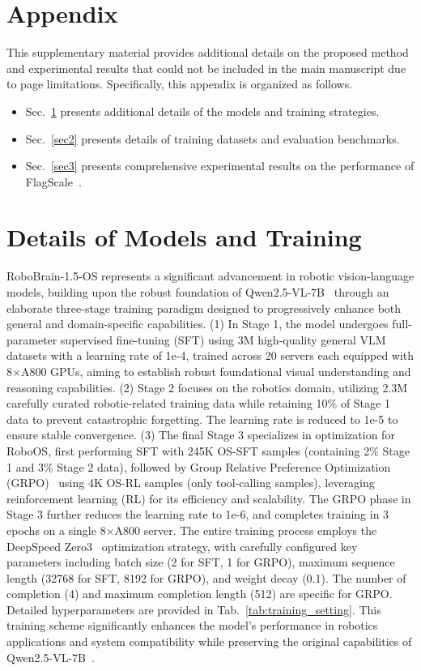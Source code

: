 \clearpage
\appendix
\section*{Appendix}

This supplementary material provides additional details on the proposed method and experimental results that could not be included in the main manuscript due to page limitations.
Specifically, this appendix is organized as follows.

\begin{itemize}[left=1em]
\item Sec.~\ref{sec1} presents additional details of the models and training strategies. 
\item Sec.~\ref{sec2} presents details of training datasets and evaluation benchmarks.
\item Sec.~\ref{sec3} presents comprehensive experimental results on the performance of FlagScale~\cite{FlagScale2024}.
\end{itemize}


\section{Details of Models and Training}
\label{sec1}

RoboBrain-1.5-OS represents a significant advancement in robotic vision-language models, building upon the robust foundation of Qwen2.5-VL-7B~\cite{Qwen2.5-VL} through an elaborate three-stage training paradigm designed to progressively enhance both general and domain-specific capabilities.
(1) In Stage 1, the model undergoes full-parameter supervised fine-tuning (SFT) using 3M high-quality general VLM datasets with a learning rate of 1e-4, trained across 20 servers each equipped with 8$\times$A800 GPUs, aiming to establish robust foundational visual understanding and reasoning capabilities. (2) Stage 2 focuses on the robotics domain, utilizing 2.3M carefully curated robotic-related training data while retaining 10\% of Stage 1 data to prevent catastrophic forgetting. The learning rate is reduced to 1e-5 to ensure stable convergence. (3) The final Stage 3 specializes in optimization for RoboOS, first performing SFT with 245K OS-SFT samples (containing 2\% Stage 1 and 3\% Stage 2 data), followed by Group Relative Preference Optimization (GRPO)~\cite{shao2024grpo} using 4K OS-RL samples (only tool-calling samples), leveraging reinforcement learning (RL) for its efficiency and scalability. The GRPO phase in Stage 3 further reduces the learning rate to 1e-6, and completes training in 3 epochs on a single 8$\times$A800 server. The entire training process employs the DeepSpeed Zero3~\cite{zero} optimization strategy, with carefully configured key parameters including batch size (2 for SFT, 1 for GRPO), maximum sequence length (32768 for SFT, 8192 for GRPO), and weight decay (0.1). The number of completion (4) and maximum completion length (512) are specific for GRPO. Detailed hyperparameters are provided in Tab.~\ref{tab:training_setting}. This training scheme significantly enhances the model's performance in robotics applications and system compatibility while preserving the original capabilities of Qwen2.5-VL-7B~\cite{Qwen2.5-VL}.

